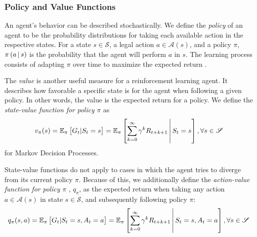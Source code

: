 \subsubsection{Policy and Value Functions}
An agent's behavior can be described stochastically. We define the \textit{policy} of an agent to be the probability distributions for taking each available action in the respective states. For a state $s \in \mathscr{S}$, a legal action $a \in \mathscr{A}(s)$, and a policy $\pi$, $\pi\left(a \,\middle|\, s\right)$ is the probability that the agent will perform $a$ in $s$. The learning process consists of adapting $\pi$ over time to maximize the expected return \cite{bible}.

The \textit{value} is another useful measure for a reinforcement learning agent. It describes how favorable a specific state is for the agent when following a given policy. In other words, the value is the expected return for a policy. We define the \textit{state-value function for policy $\pi$} \cite{bible} as
\begin{equation*}
    v_\pi(s) = \mathbb{E}_\pi\left[G_t | S_t = s\right]
             = \mathbb{E}_\pi\left[\sum_{k=0}^\infty \gamma^k R_{t+k+1} \,\middle|\, S_t = s\right], \forall s \in \mathscr{S}
\end{equation*}
for Markov Decision Processes.

State-value functions do not apply to cases in which the agent tries to diverge from its current policy $\pi$. Because of this, we additionally define the \textit{action-value function for policy $\pi$} \cite{bible}, $q_\pi$, as the expected return when taking any action $a \in \mathscr{A}(s)$ in state $s \in \mathscr{S}$, and subsequently following policy $\pi$:
\begin{equation*}
    q_\pi(s, a) = \mathbb{E}_\pi\left[G_t | S_t = s, A_t = a\right]
             = \mathbb{E}_\pi\left[\sum_{k=0}^\infty \gamma^k R_{t+k+1} \,\middle|\, S_t = s, A_t = a\right], \forall s \in \mathscr{S}
\end{equation*}
